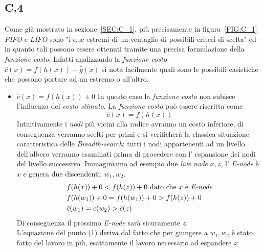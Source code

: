 \documentclass[a4paper]{article}
\begin{document}
\subsection{C.4}
\label{SEC:C4}
Come già mostrato in sezione~\ref{SEC:C_1}, più precisamente in figura~\ref{FIG:C_1} \textit{FIFO} e \textit{LIFO} sono "i due estremi di un ventaglio di possibili criteri di scelta" ed in quanto tali possono essere ottenuti tramite una precisa formulazione della \textit{funzione costo}.
Infatti analizzando la \textit{funzione costo} $\hat c(x) = f(h(x)) + \hat g(x)$ si nota facilmente quali sono le possibili casistiche che possono portare ad un estremo o all'altro.
\begin{itemize}
	\item $\hat c(x) = f(h(x)) + 0$ In questo caso la \textit{funzione costo} non subisce l'influenza del \textit{costo stimato}.
		La \textit{funzione costo} può essere riscritta come $$\hat c(x) = f(h(x))$$
		Intuitivamente i \textit{nodi} più vicini alla radice avranno un costo inferiore, di conseguenza verranno scelti per primi e si verificherà la classica situazione caratteristica delle \textit{Breadth-search}: tutti i nodi appartenenti ad un livello dell'albero verranno esaminati prima di procedere con l' espansione dei nodi del livello successivo.
Immaginiamo ad esempio due \textit{live node} $x,z$, l' \textit{E-node} è $x$ e genera due discendenti: $w_1, w_2$.
                \begin{align}
                        &f(h(x)) + 0 < f(h(z)) + 0 \text{ dato che $x$ è \textit{E-node}} \notag \\
                        &f(h(w_1)) + 0 = f(h(w_1)) + 0 > f(h(z)) + 0 \\
                        &\hat c(w_1) = c(w_2) > \hat c(z) \notag
                \end{align}
Di conseguenza il prossimo \textit{E-node} sarà sicuramente $z$.\\
L'equazione del punto (1) deriva dal fatto che per giungere a $w_1,w_2$ è stato fatto del lavoro in più, esattamente il lavoro necessario ad espandere $x$


\end{itemize}
\end{document}
